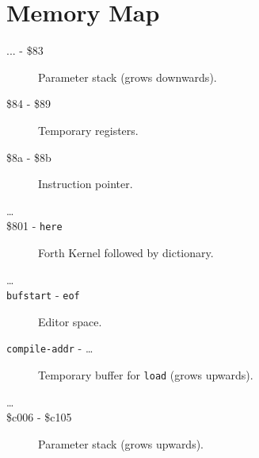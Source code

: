 \chapter{Memory Map}

\begin{description}
\item[... - \$83] Parameter stack (grows downwards).
\item[\$84 - \$89] Temporary registers.
\item[\$8a - \$8b] Instruction pointer.
\item[\ldots]
\item[\$801 - \texttt{here}] Forth Kernel followed by dictionary.
\item[\ldots]
\item[\texttt{bufstart} - \texttt{eof}] Editor space.
\item[\texttt{compile-addr} - \ldots] Temporary buffer for \texttt{load} (grows upwards).
\item[\ldots]
\item[\$c006 - \$c105] Parameter stack (grows upwards).
\end{description}

